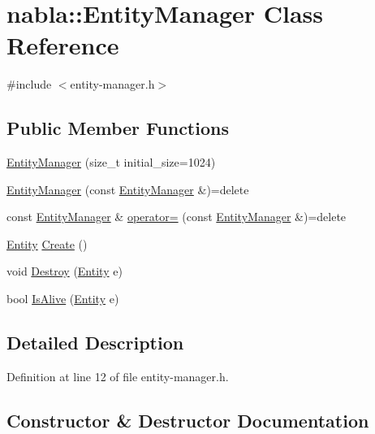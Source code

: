 \hypertarget{classnabla_1_1_entity_manager}{}\section{nabla\+::Entity\+Manager Class Reference}
\label{classnabla_1_1_entity_manager}


{\ttfamily \#include $<$entity-\/manager.\+h$>$}

\subsection*{Public Member Functions}
\begin{DoxyCompactItemize}
\item 
\mbox{\hyperlink{classnabla_1_1_entity_manager_ab25574ad61a0c1eb347e764ff7ae5127}{Entity\+Manager}} (size\+\_\+t initial\+\_\+size=1024)
\item 
\mbox{\hyperlink{classnabla_1_1_entity_manager_a4d638392cf93db8ffd2f905d492d3844}{Entity\+Manager}} (const \mbox{\hyperlink{classnabla_1_1_entity_manager}{Entity\+Manager}} \&)=delete
\item 
const \mbox{\hyperlink{classnabla_1_1_entity_manager}{Entity\+Manager}} \& \mbox{\hyperlink{classnabla_1_1_entity_manager_a49c8656945507bf10bd03d66178c4b7a}{operator=}} (const \mbox{\hyperlink{classnabla_1_1_entity_manager}{Entity\+Manager}} \&)=delete
\item 
\mbox{\hyperlink{structnabla_1_1_entity}{Entity}} \mbox{\hyperlink{classnabla_1_1_entity_manager_a8b40cde679503899a48047863dcd574b}{Create}} ()
\item 
void \mbox{\hyperlink{classnabla_1_1_entity_manager_ae878657ba6694c9d9d73a758fe8e0a63}{Destroy}} (\mbox{\hyperlink{structnabla_1_1_entity}{Entity}} e)
\item 
bool \mbox{\hyperlink{classnabla_1_1_entity_manager_aa1a4c386de6b8d24c8da3e596164cef7}{Is\+Alive}} (\mbox{\hyperlink{structnabla_1_1_entity}{Entity}} e)
\end{DoxyCompactItemize}


\subsection{Detailed Description}


Definition at line 12 of file entity-\/manager.\+h.



\subsection{Constructor \& Destructor Documentation}
\mbox{\label{classnabla_1_1_entity_manager_ab25574ad61a0c1eb347e764ff7ae5127}} 
